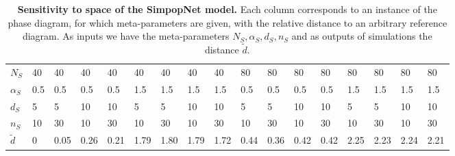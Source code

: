 \documentclass[graybox]{svmult}
\begin{document}
\begin{table}[!ht]
\caption{\textbf{Sensitivity to space of the SimpopNet model.} Each column corresponds to an instance of the phase diagram, for which meta-parameters are given, with the relative distance to an arbitrary reference diagram. As inputs we have the meta-parameters $N_S,\alpha_S,d_S,n_S$ and as outputs of simulations the distance $\tilde{d}$.\label{tab:macrocoevolexplo:spacematters}}
\centering
\begin{tabular}{|l|l|l|l|l|l|l|l|l|l|l|l|l|l|l|l|l|}
\hline
$N_S$ & 40 & 40 & 40 & 40 & 40 & 40 & 40 & 40 & 80 & 80 & 80 & 80 & 80 & 80 & 80 & 80\\
$\alpha_S$ & 0.5 & 0.5 & 0.5 & 0.5 & 1.5 & 1.5 & 1.5 & 1.5 & 0.5 & 0.5 & 0.5 & 0.5 & 1.5 & 1.5 & 1.5 & 1.5\\
$d_S$ & 5 & 5 & 10 & 10 & 5 & 5 & 10 & 10 & 5 & 5 & 10 & 10 & 5 & 5 & 10 & 10\\
$n_S$ & 10 & 30 & 10 & 30 & 10 & 30 & 10 & 30 & 10 & 30 & 10 & 30 & 10 & 30 & 10 & 30\\\hline
$\tilde{d}$ & 0 & 0.05 & 0.26 & 0.21 & 1.79 & 1.80 & 1.79 & 1.72 & 0.44 & 0.36 & 0.42 & 0.42 & 2.25 & 2.23 & 2.24 & 2.21\\\hline
\end{tabular}
\end{table}
\end{document}
